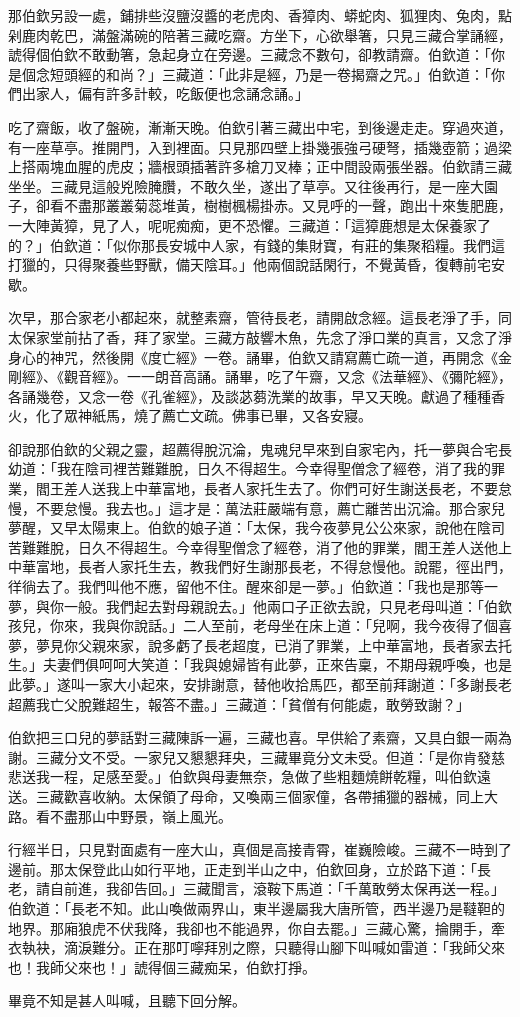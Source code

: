 那伯欽另設一處，鋪排些沒鹽沒醬的老虎肉、香獐肉、蟒蛇肉、狐狸肉、兔肉，點剁鹿肉乾巴，滿盤滿碗的陪著三藏吃齋。方坐下，心欲舉箸，只見三藏合掌誦經，諕得個伯欽不敢動箸，急起身立在旁邊。三藏念不數句，卻教請齋。伯欽道：「你是個念短頭經的和尚？」三藏道：「此非是經，乃是一卷揭齋之咒。」伯欽道：「你們出家人，偏有許多計較，吃飯便也念誦念誦。」

吃了齋飯，收了盤碗，漸漸天晚。伯欽引著三藏出中宅，到後邊走走。穿過夾道，有一座草亭。推開門，入到裡面。只見那四壁上掛幾張強弓硬弩，插幾壺箭；過梁上搭兩塊血腥的虎皮；牆根頭插著許多槍刀叉棒；正中間設兩張坐器。伯欽請三藏坐坐。三藏見這般兇險腌臢，不敢久坐，遂出了草亭。又往後再行，是一座大園子，卻看不盡那叢叢菊蕊堆黃，樹樹楓楊掛赤。又見呼的一聲，跑出十來隻肥鹿，一大陣黃獐，見了人，呢呢痴痴，更不恐懼。三藏道：「這獐鹿想是太保養家了的？」伯欽道：「似你那長安城中人家，有錢的集財寶，有莊的集聚稻糧。我們這打獵的，只得聚養些野獸，備天陰耳。」他兩個說話閑行，不覺黃昏，復轉前宅安歇。

次早，那合家老小都起來，就整素齋，管待長老，請開啟念經。這長老淨了手，同太保家堂前拈了香，拜了家堂。三藏方敲響木魚，先念了淨口業的真言，又念了淨身心的神咒，然後開《度亡經》一卷。誦畢，伯欽又請寫薦亡疏一道，再開念《金剛經》、《觀音經》。一一朗音高誦。誦畢，吃了午齋，又念《法華經》、《彌陀經》，各誦幾卷，又念一卷《孔雀經》，及談苾蒭洗業的故事，早又天晚。獻過了種種香火，化了眾神紙馬，燒了薦亡文疏。佛事已畢，又各安寢。

卻說那伯欽的父親之靈，超薦得脫沉淪，鬼魂兒早來到自家宅內，托一夢與合宅長幼道：「我在陰司裡苦難難脫，日久不得超生。今幸得聖僧念了經卷，消了我的罪業，閻王差人送我上中華富地，長者人家托生去了。你們可好生謝送長老，不要怠慢，不要怠慢。我去也。」這才是：萬法莊嚴端有意，薦亡離苦出沉淪。那合家兒夢醒，又早太陽東上。伯欽的娘子道：「太保，我今夜夢見公公來家，說他在陰司苦難難脫，日久不得超生。今幸得聖僧念了經卷，消了他的罪業，閻王差人送他上中華富地，長者人家托生去，教我們好生謝那長老，不得怠慢他。說罷，徑出門，徉徜去了。我們叫他不應，留他不住。醒來卻是一夢。」伯欽道：「我也是那等一夢，與你一般。我們起去對母親說去。」他兩口子正欲去說，只見老母叫道：「伯欽孩兒，你來，我與你說話。」二人至前，老母坐在床上道：「兒啊，我今夜得了個喜夢，夢見你父親來家，說多虧了長老超度，已消了罪業，上中華富地，長者家去托生。」夫妻們俱呵呵大笑道：「我與媳婦皆有此夢，正來告稟，不期母親呼喚，也是此夢。」遂叫一家大小起來，安排謝意，替他收拾馬匹，都至前拜謝道：「多謝長老超薦我亡父脫難超生，報答不盡。」三藏道：「貧僧有何能處，敢勞致謝？」

伯欽把三口兒的夢話對三藏陳訴一遍，三藏也喜。早供給了素齋，又具白銀一兩為謝。三藏分文不受。一家兒又懇懇拜央，三藏畢竟分文未受。但道：「是你肯發慈悲送我一程，足感至愛。」伯欽與母妻無奈，急做了些粗麵燒餅乾糧，叫伯欽遠送。三藏歡喜收納。太保領了母命，又喚兩三個家僮，各帶捕獵的器械，同上大路。看不盡那山中野景，嶺上風光。

行經半日，只見對面處有一座大山，真個是高接青霄，崔巍險峻。三藏不一時到了邊前。那太保登此山如行平地，正走到半山之中，伯欽回身，立於路下道：「長老，請自前進，我卻告回。」三藏聞言，滾鞍下馬道：「千萬敢勞太保再送一程。」伯欽道：「長老不知。此山喚做兩界山，東半邊屬我大唐所管，西半邊乃是韃靼的地界。那廂狼虎不伏我降，我卻也不能過界，你自去罷。」三藏心驚，掄開手，牽衣執袂，滴淚難分。正在那叮嚀拜別之際，只聽得山腳下叫喊如雷道：「我師父來也！我師父來也！」諕得個三藏痴呆，伯欽打掙。

畢竟不知是甚人叫喊，且聽下回分解。
